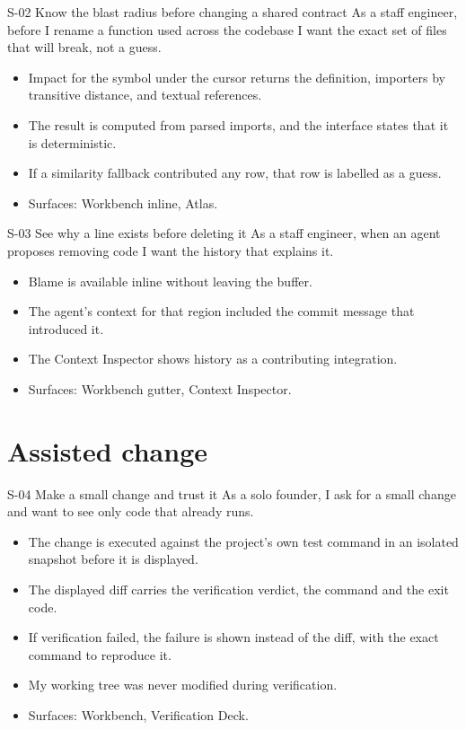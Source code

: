 \begin{story}{S-02 \quad Know the blast radius before changing a shared contract}
As a staff engineer, before I rename a function used across the codebase I want the exact set
of files that will break, not a guess.
\end{story}
\begin{itemize}
  \item Impact for the symbol under the cursor returns the definition, importers by
  transitive distance, and textual references.
  \item The result is computed from parsed imports, and the interface states that it is
  deterministic.
  \item If a similarity fallback contributed any row, that row is labelled as a guess.
  \item Surfaces: Workbench inline, Atlas.
\end{itemize}

\begin{story}{S-03 \quad See why a line exists before deleting it}
As a staff engineer, when an agent proposes removing code I want the history that explains it.
\end{story}
\begin{itemize}
  \item Blame is available inline without leaving the buffer.
  \item The agent's context for that region included the commit message that introduced it.
  \item The Context Inspector shows history as a contributing integration.
  \item Surfaces: Workbench gutter, Context Inspector.
\end{itemize}

\section{Assisted change}

\begin{story}{S-04 \quad Make a small change and trust it}
As a solo founder, I ask for a small change and want to see only code that already runs.
\end{story}
\begin{itemize}
  \item The change is executed against the project's own test command in an isolated snapshot
  before it is displayed.
  \item The displayed diff carries the verification verdict, the command and the exit code.
  \item If verification failed, the failure is shown instead of the diff, with the exact
  command to reproduce it.
  \item My working tree was never modified during verification.
  \item Surfaces: Workbench, Verification Deck.
\end{itemize}

